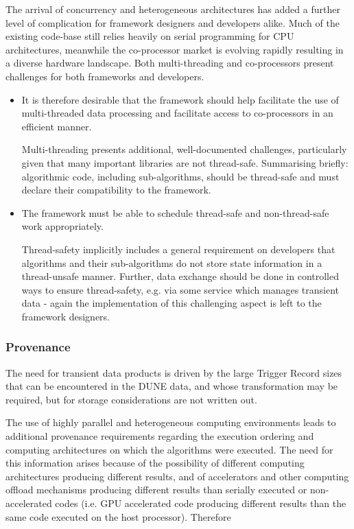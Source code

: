 \documentclass[../main-v1.tex]{subfiles}
\begin{document}
The arrival of concurrency and heterogeneous architectures has added a further level of complication for framework designers and developers alike.  Much of the existing code-base still relies heavily on serial programming for CPU architectures, meanwhile the co-processor market is evolving rapidly resulting in a diverse hardware landscape.  Both multi-threading and co-processors present challenges for both frameworks and developers.  
\begin{itemize}
\item It is therefore desirable that the framework should help facilitate the use of multi-threaded data processing and facilitate access to co-processors in an efficient manner. 


Multi-threading presents additional, well-documented challenges, particularly given that many important libraries are not thread-safe.  Summarising briefly: algorithmic code, including sub-algorithms, should be thread-safe and must declare their compatibility to the framework.

\item The framework must be able to schedule thread-safe and non-thread-safe work appropriately.  

Thread-safety implicitly includes a general requirement on developers that algorithms and their sub-algorithms do not store state information in a thread-unsafe manner.  Further, data exchange should be done in controlled ways to ensure thread-safety, e.g. via some service which manages transient data - again the implementation of this challenging aspect is left to the framework designers.

\end{itemize}
\subsubsection{Provenance} %


The need for transient data products is driven by the large Trigger Record sizes that can be encountered in the DUNE data, and whose transformation may be required, but for storage considerations are not written out.

The use of highly parallel and heterogeneous computing environments leads to additional provenance requirements regarding the execution ordering and computing architectures on which the algorithms were executed.  The need for this information arises because of the possibility of different computing architectures producing different results, and of accelerators and other computing offload mechanisms producing different results than serially executed or non-accelerated codes (i.e. GPU accelerated code producing different results than the same code executed on the host processor).  Therefore 
\end{document}
